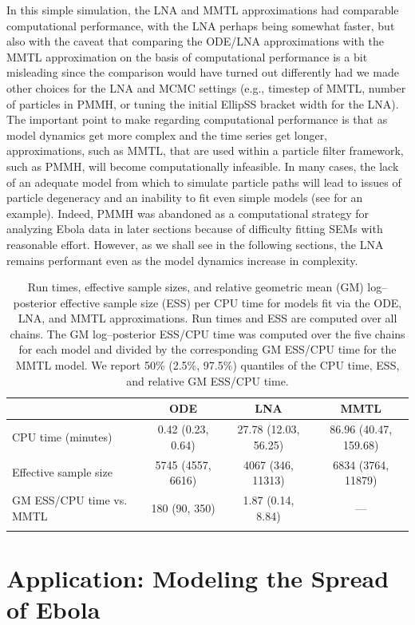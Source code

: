  In this simple simulation, the LNA and MMTL approximations had comparable computational performance, with the LNA perhaps being somewhat faster, but also with the caveat that comparing the ODE/LNA approximations with the MMTL approximation on the basis of computational performance is a bit misleading since the comparison would have turned out differently had we made other choices for the LNA and MCMC settings (e.g., timestep of MMTL, number of particles in PMMH, or tuning the initial EllipSS bracket width for the LNA). The important point to make regarding computational performance is that as model dynamics get more complex and the time series get longer, approximations, such as MMTL, that are used within a particle filter framework, such as PMMH, will become computationally infeasible. In many cases, the lack of an adequate model from which to simulate particle paths will lead to issues of particle degeneracy and an inability to fit even simple models (see \cite{fintzi2017efficient} for an example). Indeed, PMMH was abandoned as a computational strategy for analyzing Ebola data in later sections because of difficulty fitting SEMs with reasonable effort. However, as we shall see in the following sections, the LNA remains performant even as the model dynamics increase in complexity. 
 
 \begin{table}[!h]
 	\label{tab:lna_coverage_compstats}
 	\caption{Run times, effective sample sizes, and relative geometric mean (GM) log--posterior effective sample size (ESS) per CPU time for models fit via the ODE, LNA, and MMTL approximations. Run times and ESS are computed over all chains. The GM log--posterior ESS/CPU time was computed over the five chains for each model and divided by the corresponding GM ESS/CPU time for the MMTL model. We report 50\% (2.5\%, 97.5\%) quantiles of the CPU time, ESS, and relative GM ESS/CPU time.}\footnotesize
 	\centering
 	\begin{tabular}{lccc}		
 		& \textbf{ODE} & \textbf{LNA} & \textbf{MMTL} \\\hline
 		CPU time (minutes) &  0.42 (0.23, 0.64) & 27.78  (12.03, 56.25) & 86.96 (40.47, 159.68) \\ 
 		Effective sample size & 5745 (4557, 6616) & 4067   (346, 11313) & 6834 (3764, 11879) \\
 		GM ESS/CPU time vs. MMTL & 180 (90, 350) & 1.87 (0.14, 8.84) & --- \\
 		\hline
 		&&&
 	\end{tabular} 
 \end{table}

\section{Application: Modeling the Spread of Ebola}
\label{sec:lna_ebola}